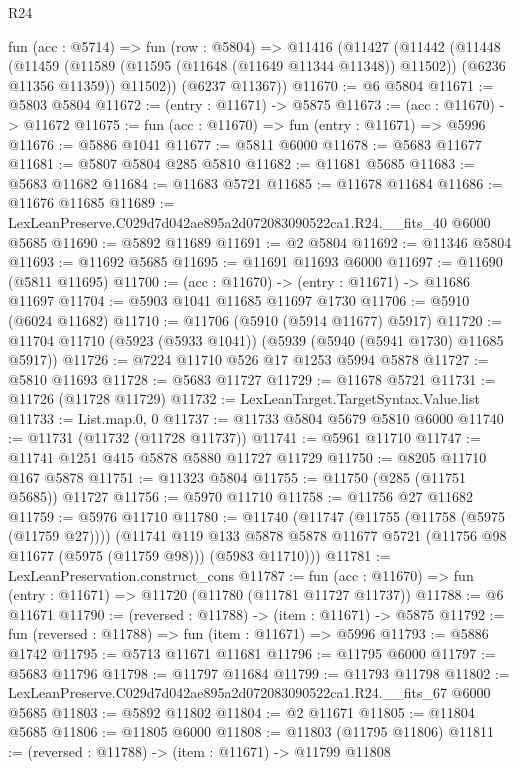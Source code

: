 \begin{lexlean}{R24}
\begin{coremodule}
  fun (acc : @5714) =>
  fun (row : @5804) =>
  @11416
    (@11427
      (@11442
        (@11448
          (@11459 (@11589 (@11595 (@11648 (@11649 @11344 @11348)) @11502)) (@6236 @11356 @11359))
          @11502))
      (@6237 @11367))
@11670 := @6 @5804
@11671 := @5803 @5804
@11672 := (entry : @11671) -> @5875
@11673 := (acc : @11670) -> @11672
@11675 := fun (acc : @11670) => fun (entry : @11671) => @5996
@11676 := @5886 @1041
@11677 := @5811 @6000
@11678 := @5683 @11677
@11681 := @5807 @5804 @285 @5810
@11682 := @11681 @5685
@11683 := @5683 @11682
@11684 := @11683 @5721
@11685 := @11678 @11684
@11686 := @11676 @11685
@11689 := LexLeanPreserve.C029d7d042ae895a2d072083090522ca1.R24.__fits_40 @6000 @5685
@11690 := @5892 @11689
@11691 := @2 @5804
@11692 := @11346 @5804
@11693 := @11692 @5685
@11695 := @11691 @11693 @6000
@11697 := @11690 (@5811 @11695)
@11700 := (acc : @11670) -> (entry : @11671) -> @11686 @11697
@11704 := @5903 @1041 @11685 @11697 @1730
@11706 := @5910 (@6024 @11682)
@11710 := @11706 (@5910 (@5914 @11677) @5917)
@11720 := @11704 @11710 (@5923 (@5933 @1041)) (@5939 (@5940 (@5941 @1730) @11685 @5917))
@11726 := @7224 @11710 @526 @17 @1253 @5994 @5878
@11727 := @5810 @11693
@11728 := @5683 @11727
@11729 := @11678 @5721
@11731 := @11726 (@11728 @11729)
@11732 := LexLeanTarget.TargetSyntax.Value.list
@11733 := List.map.{0, 0}
@11737 := @11733 @5804 @5679 @5810 @6000
@11740 := @11731 (@11732 (@11728 @11737))
@11741 := @5961 @11710
@11747 := @11741 @1251 @415 @5878 @5880 @11727 @11729
@11750 := @8205 @11710 @167 @5878
@11751 := @11323 @5804
@11755 := @11750 (@285 (@11751 @5685)) @11727
@11756 := @5970 @11710
@11758 := @11756 @27 @11682
@11759 := @5976 @11710
@11780 := @11740
    (@11747
      (@11755 (@11758 (@5975 (@11759 @27))))
      (@11741
        @119
        @133
        @5878
        @5878
        @11677
        @5721
        (@11756 @98 @11677 (@5975 (@11759 @98)))
        (@5983 @11710)))
@11781 := LexLeanPreservation.construct_cons
@11787 := fun (acc : @11670) => fun (entry : @11671) => @11720 (@11780 (@11781 @11727 @11737))
@11788 := @6 @11671
@11790 := (reversed : @11788) -> (item : @11671) -> @5875
@11792 := fun (reversed : @11788) => fun (item : @11671) => @5996
@11793 := @5886 @1742
@11795 := @5713 @11671 @11681
@11796 := @11795 @6000
@11797 := @5683 @11796
@11798 := @11797 @11684
@11799 := @11793 @11798
@11802 := LexLeanPreserve.C029d7d042ae895a2d072083090522ca1.R24.__fits_67 @6000 @5685
@11803 := @5892 @11802
@11804 := @2 @11671
@11805 := @11804 @5685
@11806 := @11805 @6000
@11808 := @11803 (@11795 @11806)
@11811 := (reversed : @11788) -> (item : @11671) -> @11799 @11808

\end{coremodule}
\end{lexlean}
